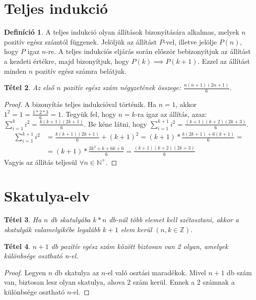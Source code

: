 \documentclass[twoside,12pt]{report}
\newtheorem{theorem}{Tétel}[section]
\theoremstyle{definition}
\newtheorem{definition}[theorem]{Definíció}
\begin{document}
\section{Teljes indukció}
	\begin{definition}
		A teljes indukció olyan állítások bizonyítására alkalmas, melyek $n$ pozitív egész számtól függenek. Jelöljük az állítást $P$-vel, illetve jelölje $P(n)$, hogy $P$ igaz $n$-re. A teljes indukciós eljárás során először bebizonyítjuk az állítást a kezdeti értékre, majd bizonyítjuk, hogy $P(k)\implies P(k+1)$. Ezzel az állítást minden $n$ pozitív egész számra belátjuk.
	\end{definition}
	\begin{theorem}
		Az első $n$ pozitív egész szám négyzetének összege: $\frac{n(n+1)(2n+1)}{6}$.
	\end{theorem}
	\begin{proof}
		A bizonyítás teljes indukcióval történik. Ha $n=1$, akkor $1^2=1=\frac{1*2*3}{6}=1$. Tegyük fel, hogy $n=k$-ra igaz az állítás, azaz: $\sum_{i=1}^{k} i^2=\frac{k(k+1)(2k+1)}{6}$. Be kéne látni, hogy $\sum_{i=1}^{k+1} i^2=\frac{(k+1)(k+2)(2k+3)}{6}$.
		\begin{align*}
			\sum_{i=1}^{k+1} i^2&=\frac{k(k+1)(2k+1)}{6}+(k+1)^2=(k+1)*\frac{k(2k+1)+6(k+1)}{6}=\\
			&=(k+1)*\frac{2k^2+k+6k+6}{6}=\frac{(k+1)(k+2)(2k+3)}{6}
		\end{align*}
		Vagyis az állítás teljesül $\forall n\in\mathbb{N}^+$.
	\end{proof}
\section{Skatulya-elv}
	\begin{theorem}
		Ha $n$ db skatulyába $k*n$ db-nál több elemet kell szétosztani, akkor a skatulyák valamelyikébe legalább $k+1$ elem kerül $(n,k\in\mathbb{Z})$.
	\end{theorem}
	\begin{theorem}
		$n+1$ db pozitív egész szám között biztosan van 2 olyan, amelyek különbsége osztható n-el.
	\end{theorem}
	\begin{proof}
		Legyen $n$ db skatulya az $n$-el való osztási maradékok. Mivel $n+1$ db szám van, biztosan lesz olyan skatulya, ahova 2 szám kerül. Ennek a 2 számnak a különbsége osztható $n$-el.
	\end{proof}
\end{document}
